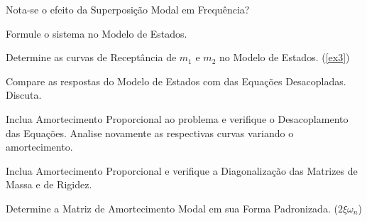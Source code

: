 \documentclass{article}
\begin{document}
\newpage\begin{exercise}\label{ex8}
    Nota-se o efeito da Superposição Modal em Frequência?
\end{exercise}
\begin{resolution}
    
\end{resolution}


\newpage\begin{exercise}\label{ex9}
    Formule o sistema no Modelo de Estados.
\end{exercise}
\begin{resolution}
    
\end{resolution}


\newpage\begin{exercise}\label{ex10}
    Determine as curvas de Receptância de $m_1$ e $m_2$ no Modelo de Estados. (\ref{ex3})
\end{exercise}
\begin{resolution}
    
\end{resolution}


\newpage\begin{exercise}\label{ex11}
    Compare as respostas do Modelo de Estados com das Equações Desacopladas. Discuta.
\end{exercise}
\begin{resolution}
    
\end{resolution}


\newpage\begin{exercise}\label{ex12}
    Inclua Amortecimento Proporcional ao problema e verifique o Desacoplamento das Equações. Analise novamente as respectivas curvas variando o amortecimento.
\end{exercise}
\begin{resolution}
    
\end{resolution}


\newpage\begin{exercise}\label{ex13}
    Inclua Amortecimento Proporcional e verifique a Diagonalização das Matrizes de Massa e de Rigidez.
\end{exercise}
\begin{resolution}
    
\end{resolution}


\newpage\begin{exercise}\label{ex14}
    Determine a Matriz de Amortecimento Modal em sua Forma Padronizada. ($2\xi\omega_n$)
\end{exercise}
\begin{resolution}
    
\end{resolution}
\end{document}

